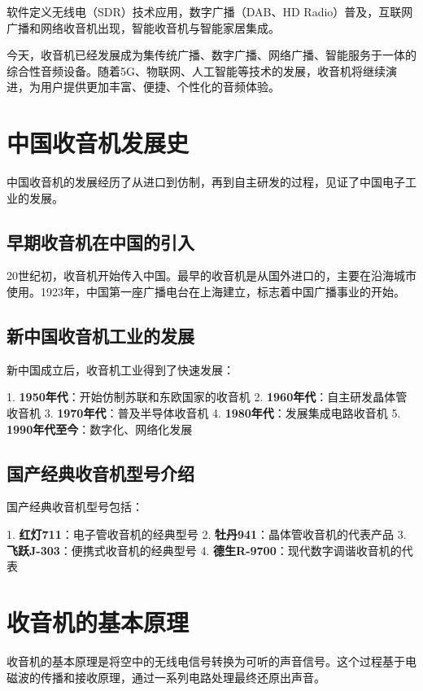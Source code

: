 \documentclass[12pt,UTF8]{ctexbook}
\begin{document}
软件定义无线电（SDR）技术应用，数字广播（DAB、HD Radio）普及，互联网广播和网络收音机出现，智能收音机与智能家居集成。

今天，收音机已经发展成为集传统广播、数字广播、网络广播、智能服务于一体的综合性音频设备。随着5G、物联网、人工智能等技术的发展，收音机将继续演进，为用户提供更加丰富、便捷、个性化的音频体验。

\section{中国收音机发展史}

中国收音机的发展经历了从进口到仿制，再到自主研发的过程，见证了中国电子工业的发展。

\subsection{早期收音机在中国的引入}

20世纪初，收音机开始传入中国。最早的收音机是从国外进口的，主要在沿海城市使用。1923年，中国第一座广播电台在上海建立，标志着中国广播事业的开始。

\subsection{新中国收音机工业的发展}

新中国成立后，收音机工业得到了快速发展：

1. \textbf{1950年代}：开始仿制苏联和东欧国家的收音机
2. \textbf{1960年代}：自主研发晶体管收音机
3. \textbf{1970年代}：普及半导体收音机
4. \textbf{1980年代}：发展集成电路收音机
5. \textbf{1990年代至今}：数字化、网络化发展

\subsection{国产经典收音机型号介绍}

国产经典收音机型号包括：

1. \textbf{红灯711}：电子管收音机的经典型号
2. \textbf{牡丹941}：晶体管收音机的代表产品
3. \textbf{飞跃J-303}：便携式收音机的经典型号
4. \textbf{德生R-9700}：现代数字调谐收音机的代表

\section{收音机的基本原理}

收音机的基本原理是将空中的无线电信号转换为可听的声音信号。这个过程基于电磁波的传播和接收原理，通过一系列电路处理最终还原出声音。
\end{document}
